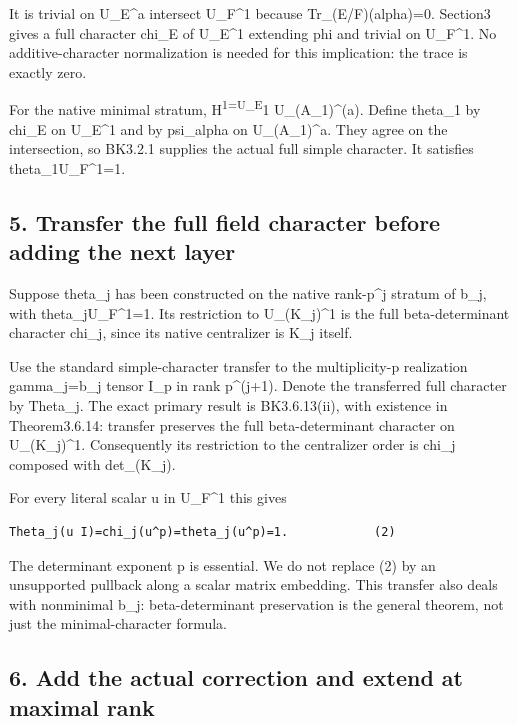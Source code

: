 It is trivial on U\_E\^{}a intersect U\_F\^{}1 because
Tr\_(E/F)(alpha)=0. Section3 gives a full character chi\_E of U\_E\^{}1
extending phi and trivial on U\_F\^{}1. No additive-character
normalization is needed for this implication: the trace is exactly zero.

For the native minimal stratum, H\textsuperscript{1=U\_E}1
U\_(A\_1)\^{}(a). Define theta\_1 by chi\_E on U\_E\^{}1 and by
psi\_alpha on U\_(A\_1)\^{}a. They agree on the intersection, so BK3.2.1
supplies the actual full simple character. It satisfies
theta\_1\textbar U\_F\^{}1=1.

\hypertarget{odd_character-transfer-the-full-field-character-before-adding-the-next-layer}{%
\subsection{5. Transfer the full field character before adding the next
layer}\label{odd_character-transfer-the-full-field-character-before-adding-the-next-layer}}

Suppose theta\_j has been constructed on the native rank-p\^{}j stratum
of b\_j, with theta\_j\textbar U\_F\^{}1=1. Its restriction to
U\_(K\_j)\^{}1 is the full beta-determinant character chi\_j, since its
native centralizer is K\_j itself.

Use the standard simple-character transfer to the multiplicity-p
realization gamma\_j=b\_j tensor I\_p in rank p\^{}(j+1). Denote the
transferred full character by Theta\_j. The exact primary result is
BK3.6.13(ii), with existence in Theorem3.6.14: transfer preserves the
full beta-determinant character on U\_(K\_j)\^{}1. Consequently its
restriction to the centralizer order is chi\_j composed with
det\_(K\_j).

For every literal scalar u in U\_F\^{}1 this gives

\begin{Verbatim}[fontsize=\small,breaklines=true,breakanywhere=true]
Theta_j(u I)=chi_j(u^p)=theta_j(u^p)=1.            (2)
\end{Verbatim}

The determinant exponent p is essential. We do not replace (2) by an
unsupported pullback along a scalar matrix embedding. This transfer also
deals with nonminimal b\_j: beta-determinant preservation is the general
theorem, not just the minimal-character formula.

\hypertarget{odd_character-add-the-actual-correction-and-extend-at-maximal-rank}{%
\subsection{6. Add the actual correction and extend at maximal
rank}\label{odd_character-add-the-actual-correction-and-extend-at-maximal-rank}}

